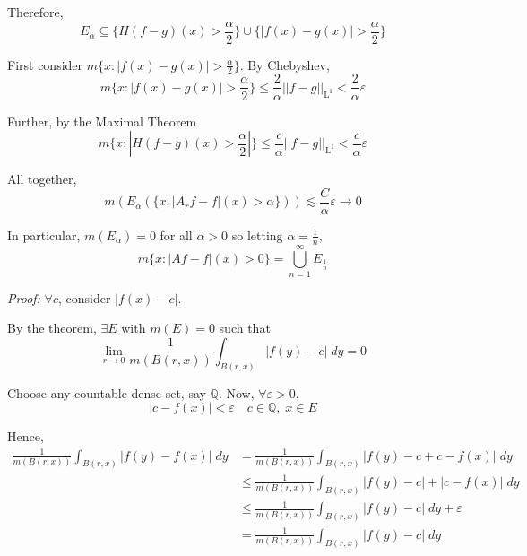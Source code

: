 \documentclass[12pt]{report}
\newcommand{\R}{\mathbb{R}}
\newcommand{\Q}{\mathbb{Q}}
\newcommand{\abs}[1]{\left\vert #1 \right\vert}
\newcommand{\norm}[1]{\left\vert\left\vert #1 \right\vert\right\vert}
\newcommand{\ep}{\varepsilon}
\renewcommand{\L}{\text{L}}
\newcommand{\sub}{\subseteq}
\newenvironment*{tbox}[2][gray]{
    \begin{tcolorbox}[
        parbox=false,
        colback=#1!5!white,
        colframe=#1!75!black,
        breakable,
        title={#2}
    ]}
    {\end{tcolorbox}}
\begin{document}
\begin{tbox}{\textbf{Theorem:} If $f \in \L^1_{\text{loc}}$< then $\lim_{r \to 0} A_r f(x) = f(x)$ a.e. for $x \in \R^n$}
            Therefore,  
            \[E_{\alpha} \sub \{H(f - g)(x) > \frac{\alpha}{2}\} \cup \{\abs{f(x) - g(x)} > \frac{\alpha}{2}\}\]

            First consider $m\{x: \abs{f(x) - g(x)} > \frac{\alpha}{2}\}$. By Chebyshev,
            \[m\{x: \abs{f(x) - g(x)} > \frac{\alpha}{2}\} \leq \frac{2}{\alpha} \norm{f - g}_{\L^1} < \frac{2}{\alpha}\ep\]

            Further, by the Maximal Theorem
            \[m\{x: \abs{H(f - g)(x) > \frac{\alpha}{2}}\} \leq \frac{c}{\alpha} \norm{f - g}_{\L^1} < \frac{c}{\alpha}\ep\]

            All together, 
            \[m(E_{\alpha}(\{x: \abs{A_r f - f}(x) > \alpha\})) \lesssim \frac{C}{\alpha} \ep \to 0 \] 

            In particular, $m(E_{\alpha}) = 0$ for all $\alpha > 0$ so letting $\alpha = \frac{1}{n}$, 
            \[m\{x: \abs{A f - f}(x) > 0\} = \bigcup_{n=1}^\infty E_{\frac{1}{n}}\]
            
        \end{tbox}

        \begin{tbox}{\textbf{Corollary:} 
            \[\frac{1}{m(B(r, x))} \int_{B(r, x)} \abs{f(y) - f(x)}\; dy \to 0 \text{ a.e}\]}
            \emph{Proof:} $\forall c$, consider $\abs{f(x) -c}$.

            By the theorem, $\exists E$ with $m(E) = 0$ such that
            \[\lim_{r \to 0} \frac{1}{m(B(r, x))} \int_{B(r, x)} \abs{f(y) - c}\; dy = 0\]

            Choose any countable dense set, say $\Q$. Now, $\forall \ep >0$, 
            \[\abs{c - f(x)} < \ep \quad c \in \Q, \;x \in E\]

            Hence, 
            \begin{align*}
                \frac{1}{m(B(r, x))} \int_{B(r, x)} \abs{f(y) - f(x)}\; dy &= \frac{1}{m(B(r, x))} \int_{B(r, x)} \abs{f(y) - c + c - f(x)}\; dy\\ 
                &\leq \frac{1}{m(B(r, x))} \int_{B(r, x)} \abs{f(y) - c}  + \abs{c - f(x)}\; dy\\
                &\leq \frac{1}{m(B(r, x))} \int_{B(r, x)} \abs{f(y) - c}\; dy + \ep\\ 
                &= \frac{1}{m(B(r, x))} \int_{B(r, x)} \abs{f(y) - c}\; dy 
            \end{align*}
        \end{tbox}
\end{document}
